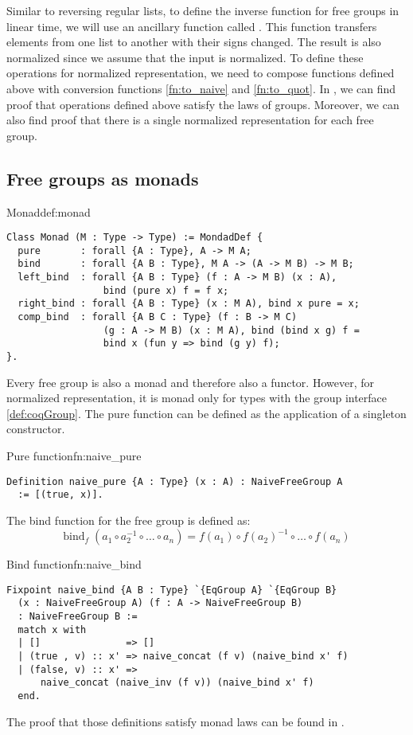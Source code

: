 Similar to reversing regular lists, to define the inverse function for free groups  in linear time, we will use an ancillary function called . This function transfers elements from one list to another with their signs changed. The result is also normalized since we assume that the input is normalized.
To define these operations for normalized representation, we need to compose functions defined above with conversion functions \ref{fn:to_naive} and \ref{fn:to_quot}. In , we can find proof that operations defined above satisfy the laws of groups. Moreover, we can also find proof that there is a single normalized representation for each free group.  
\subsection{Free groups as monads}
\begin{defi}{Monad}{def:monad}
\begin{verbatim}
Class Monad (M : Type -> Type) := MondadDef {
  pure       : forall {A : Type}, A -> M A;
  bind       : forall {A B : Type}, M A -> (A -> M B) -> M B;
  left_bind  : forall {A B : Type} (f : A -> M B) (x : A), 
                 bind (pure x) f = f x; 
  right_bind : forall {A B : Type} (x : M A), bind x pure = x; 
  comp_bind  : forall {A B C : Type} (f : B -> M C) 
                 (g : A -> M B) (x : M A), bind (bind x g) f = 
                 bind x (fun y => bind (g y) f);
}.
\end{verbatim}
\end{defi}
Every free group is also a monad and therefore also a functor. However, for normalized representation, it is monad only for types with the group interface \ref{def:coqGroup}. The pure function can be defined as the application of a singleton constructor.
\begin{func}{Pure function}{fn:naive_pure}
\begin{verbatim}
Definition naive_pure {A : Type} (x : A) : NaiveFreeGroup A 
  := [(true, x)].
\end{verbatim}
\end{func}
The bind function for the free group is defined as:
$$
    \textrm{bind}_f \; (a_1 \circ a_2^{-1} \circ \dots \circ a_n) = f (a_1) \circ f (a_2) ^{-1} \circ \dots \circ f (a_n)
$$
\begin{func}{Bind function}{fn:naive_bind}
\begin{verbatim}
Fixpoint naive_bind {A B : Type} `{EqGroup A} `{EqGroup B} 
  (x : NaiveFreeGroup A) (f : A -> NaiveFreeGroup B) 
  : NaiveFreeGroup B :=
  match x with
  | []               => []
  | (true , v) :: x' => naive_concat (f v) (naive_bind x' f)
  | (false, v) :: x' => 
      naive_concat (naive_inv (f v)) (naive_bind x' f)
  end.
\end{verbatim}
\end{func}
The proof that those definitions satisfy monad laws can be found in .

